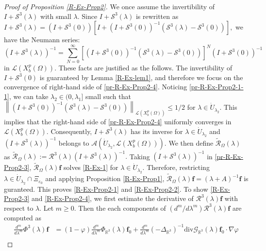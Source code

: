 \documentclass[10pt,a4paper]{amsart}
\begin{document}
\begin{proof}[Proof of Proposition \ref{R-Ex-Prop2}]
We once assume the invertibility of $I+\mathcal{S}^3(\lambda)$ with small $\lambda$. Since $I+\mathcal{S}^3(\lambda)$ is rewritten as
$I+\mathcal{S}^3(\lambda)=(I+\mathcal{S}^3(0))\left[I+(I+\mathcal{S}^3(0))^{-1}(\mathcal{S}^3(\lambda)-\mathcal{S}^3(0))\right],$ we have the Neumann series:
\begin{equation}\label{pr-R-Ex-Prop2-4}
(I+\mathcal{S}^3(\lambda))^{-1}=\sum_{N=0}^\infty \left[(I+\mathcal{S}^3(0))^{-1} (\mathcal{S}^3(\lambda)-\mathcal{S}^3(0))\right]^N(I+\mathcal{S}^3(0))^{-1}
\end{equation}
in $\mathcal{L}(X_b^p(\Omega))$.
These facts are justified as the follows. The invertibility of $I+\mathcal{S}^3(0)$ is guaranteed by Lemma \ref{R-Ex-lem1}, and therefore we focus on the convergence of right-hand side of \eqref{pr-R-Ex-Prop2-4}. Noticing \eqref{pr-R-Ex-Prop2-1-1}, we can take $\lambda_2\in (0,\lambda_1]$ small such that
$
\left\| (I+\mathcal{S}^3(0))^{-1} (\mathcal{S}^3(\lambda)-\mathcal{S}^3(0))\right\|_{\mathcal{L}(X_b^p(\Omega))} \le 1/2$ for $\lambda\in \dot{U}_{\lambda_2}.
$
This implies that the right-hand side of \eqref{pr-R-Ex-Prop2-4} uniformly converges in $\mathcal{L}(X_b^p(\Omega))$. Consequently, $I+\mathcal{S}^3(\lambda)$ has its inverse for $\lambda\in \dot{U}_{\lambda_2}$ and $(I+\mathcal{S}^3(\lambda))^{-1}$ belongs to $ \mathcal{A}(\Dot{U}_{\lambda_2},\mathcal{L}(X_b^p(\Omega))).$
We then define $\widetilde{\mathcal{R}}_{\Omega}(\lambda)$ as
$
\widetilde{\mathcal{R}}_{\Omega}(\lambda):=\mathcal{R}^3(\lambda)(I+\mathcal{S}^3(\lambda))^{-1}.
$
Taking $(I+\mathcal{S}^3(\lambda))^{-1}$ in \eqref{pr-R-Ex-Prop2-3}, $\widetilde{\mathcal{R}}_{\Omega}(\lambda)\mathbf{f}$ solves \eqref{R-Ex-1} for $\lambda\in \dot{U}_{\lambda_2}$. Therefore, restricting $\lambda\in \dot{U}_{\lambda_2}\cap \Xi_{\varepsilon_0}$ and applying Proposition \ref{R-Ex-Prop1}, $\widetilde{\mathcal{R}}_{\Omega}(\lambda)\mathbf{f}=(\lambda+A)^{-1}\mathbf{f}$ is guranteed. This proves \eqref{R-Ex-Prop2-1} and \eqref{R-Ex-Prop2-2}. To show \eqref{R-Ex-Prop2-3} and \eqref{R-Ex-Prop2-4}, we first estimate the derivative of $\mathcal{R}^3(\lambda)\mathbf{f}$ with respect to $\lambda$. Let $m\ge 0$. Then the each components of $(d^m/d\lambda^m)\mathcal{R}^3(\lambda)\mathbf{f}$ are computed as
\begin{align*}
\frac{d^m}{d\lambda^m}\Phi^3(\lambda)\mathbf{f}&=(1-\varphi)\frac{d^m}{d\lambda^m}\Phi_{\mathbb{R}^3}(\lambda)\mathbf{f}_0+\frac{d^m}{d\lambda^m}(-\Delta_{\mathbb{R}^3})^{-1}\mathrm{div}\mathcal{G}_{\mathbb{R}^3}(\lambda)\mathbf{f}_0\cdot \nabla\varphi\\

\end{align*}
\end{proof}
\end{document}
